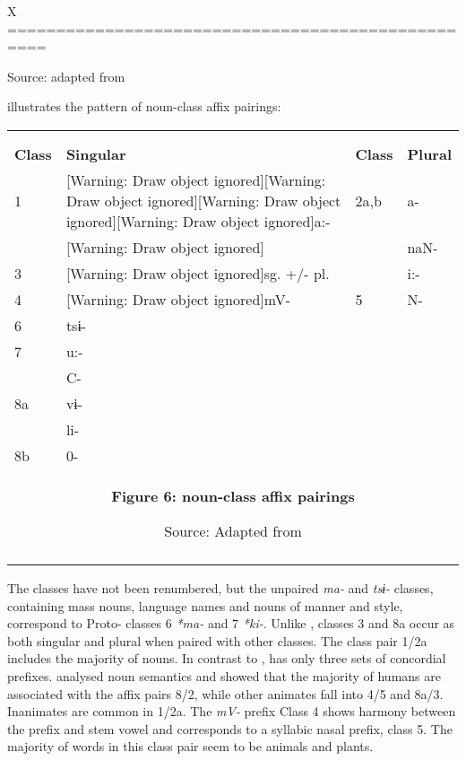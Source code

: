 \documentclass[output=paper]{langsci/langscibook}
\begin{document}
\begin{tabularx}{\textwidth}{X}
\lsptoprule
==================================================

Source: adapted from \citet{Crozier1984}

 illustrates the pattern of  noun-class affix pairings:

\begin{tabularx}{\textwidth}{XXXX}
\lsptoprule
\multicolumn{4}{c}{}\\
\multicolumn{4}{c}{}\\
\textbf{Class} & \textbf{Singular} & \textbf{Class} & \textbf{Plural}\\
1 & [Warning: Draw object ignored][Warning: Draw object ignored][Warning: Draw object ignored][Warning: Draw object ignored]a:- & 2a,b & a- \\
& [Warning: Draw object ignored] &  & naN- \\
3 & [Warning: Draw object ignored]sg. +/- pl. &  & i:- \\
4 & [Warning: Draw object ignored]mV- & 5 & N- \\
6 & tsɨ- &  & \\
7 & u:- &  & \\
& C- &  & \\
8a & vɨ- &  & \\
& li- &  & \\
8b & 0- &  & \\
\multicolumn{4}{c}{\textbf{Figure 6: \ili{Cishingini} noun-class affix pairings}

Source: Adapted from \citet{Crozier1984}}\\
\lspbottomrule
\end{tabularx}
The classes have not been renumbered, but the unpaired \textit{ma-} and \textit{tsɨ{}-} classes, containing mass nouns, language names and nouns of manner and style, correspond to Proto- classes 6 \textit{*ma}\textit{{}-} and 7 \textit{*ki}\textit{{}-}.  Unlike ,  classes 3 and 8a occur as both singular and plural when paired with other classes. The class pair 1/2a includes the majority of nouns. In contrast to ,  has only three sets of concordial prefixes. \citet{Crozier1984} analysed noun semantics and showed that the majority of humans are associated with the affix pairs 8/2, while other animates fall into 4/5 and 8a/3. Inanimates are common in 1/2a. The \textit{mV-} prefix Class 4 shows harmony between the prefix and stem vowel and corresponds to a syllabic nasal prefix, class 5. The majority of words in this class pair seem to be animals and plants.


\end{tabularx}
\end{document}

